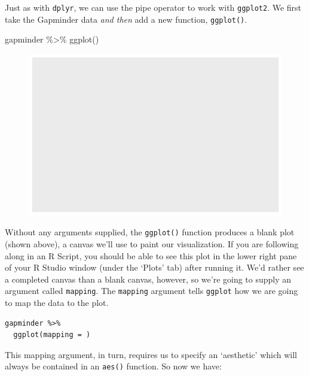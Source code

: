 \documentclass[
  letterpaper,
]{book}
\newenvironment{Shaded}{\begin{snugshade}}{\end{snugshade}}
\newcommand{\FunctionTok}[1]{\textcolor[rgb]{0.28,0.35,0.67}{#1}}
\newcommand{\NormalTok}[1]{\textcolor[rgb]{0.00,0.23,0.31}{#1}}
\newcommand{\SpecialCharTok}[1]{\textcolor[rgb]{0.37,0.37,0.37}{#1}}
\begin{document}
Just as with \texttt{dplyr}, we can use the pipe operator to work with
\texttt{ggplot2}. We first take the Gapminder data \emph{and then} add a
new function, \texttt{ggplot()}.

\begin{Shaded}
\begin{Highlighting}[]
\NormalTok{gapminder }\SpecialCharTok{\%\textgreater{}\%}
  \FunctionTok{ggplot}\NormalTok{()}
\end{Highlighting}
\end{Shaded}

\begin{figure}[H]

{\centering \includegraphics{visualizing-with-ggplot_files/figure-pdf/unnamed-chunk-14-1.pdf}

}

\end{figure}

Without any arguments supplied, the \texttt{ggplot()} function produces
a blank plot (shown above), a canvas we'll use to paint our
visualization. If you are following along in an R Script, you should be
able to see this plot in the lower right pane of your R Studio window
(under the `Plots' tab) after running it. We'd rather see a completed
canvas than a blank canvas, however, so we're going to supply an
argument called \texttt{mapping}. The \texttt{mapping} argument tells
\texttt{ggplot} how we are going to map the data to the plot.

\begin{verbatim}
gapminder %>%
  ggplot(mapping = )
\end{verbatim}

This mapping argument, in turn, requires us to specify an `aesthetic'
which will always be contained in an \texttt{aes()} function. So now we
have:
\end{document}
